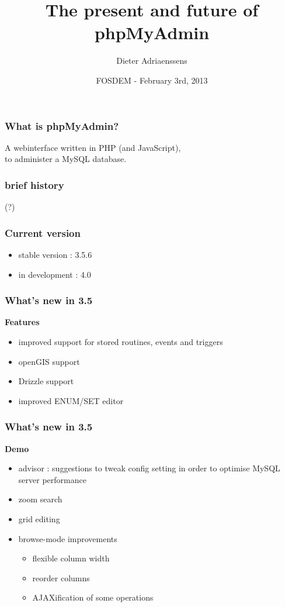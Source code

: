 \documentclass[14pt]{beamer}
\title{The present and future of phpMyAdmin}
\author{Dieter Adriaenssens}
\institute[phpMyAdmin]{phpMyAdmin developer}
\date[FOSDEM - 3Feb2013]{FOSDEM - February 3rd, 2013}
\begin{document}
  \begin{frame}
  \titlepage
  \end{frame}
  \begin{frame}
    \frametitle{What is phpMyAdmin?}
      A webinterface written in PHP (and JavaScript),\\
      to administer a MySQL database.
  \end{frame}
  \begin{frame}
    \frametitle{brief history}
    (?)
  \end{frame}
  \begin{frame}
    \frametitle{Current version}
    \begin{itemize}[<+->]
      \item stable version : 3.5.6
      \item in development : 4.0
    \end{itemize}
  \end{frame}
  \begin{frame}
    \frametitle{What's new in 3.5}
   \textbf{{\color{PmaOlive}Features}}
    \pause
    \begin{itemize}[<+->]
      \item improved support for stored routines, events and triggers
      \item openGIS support
      \item Drizzle support
      \item improved ENUM/SET editor
    \end{itemize}
  \end{frame}
  \begin{frame}
    \frametitle{What's new in 3.5}
    \textbf{{\color{PmaOlive}Demo}}
    \begin{itemize}
      \item advisor : suggestions to tweak config setting in order to optimise MySQL server performance
      \item zoom search
      \item grid editing
      \item browse-mode improvements
      \begin{itemize}
        \item flexible column width
        \item reorder columns
        \item AJAXification of some operations
      \end{itemize}
    \end{itemize}
  \end{frame}
\end{document}

